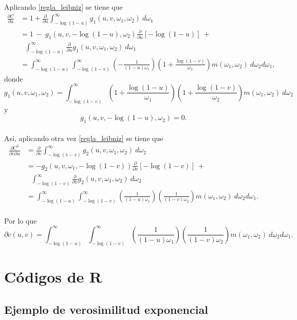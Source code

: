\documentclass[11pt,a4paper]{article}
\begin{document}
\begin{appendices}
Aplicando \eqref{regla_leibniz} se tiene que
\begin{align*}
\frac{\partial C}{\partial u} &= 1 + \frac{\partial}{\partial u} \int_{-\log (1-u)}^\infty g_1(u, v, \omega_1, \omega_2) \ d\omega_1\\
&= 1 \ - \ g_1(u, v, -\log (1-u), \omega_2)\frac{\partial}{\partial u}\left[ -\log (1-u) \right] \ +\\
& \ \ \ \int_{-\log (1-u)}^{\infty} \frac{\partial}{\partial u}g_1(u, v, \omega_1, \omega_2) \ d\omega_1\\
&= \int_{-\log (1-u)}^\infty \int_{-\log (1-v)}^\infty \left(-\frac{1}{(1-u)\omega_1}\right)\left(1+\frac{\log (1-v)}{\omega_2}\right) m(\omega_1, \omega_2) \ d\omega_2 d\omega_1,
\end{align*}
donde $$g_1(u, v, \omega_1, \omega_2) = \int_{-\log (1-v)}^\infty \left(1+\frac{\log (1-u)}{\omega_1}\right)\left(1+\frac{\log (1-v)}{\omega_2}\right) m(\omega_1, \omega_2) \ d\omega_2$$ y $$g_1(u, v, -\log (1-u), \omega_2) = 0.$$\\

Así, aplicando otra vez \eqref{regla_leibniz} se tiene que
\begin{align*}
\frac{\partial C^2}{\partial v \partial u} &= \frac{\partial}{\partial v} \int_{-\log (1-v)}^\infty g_2(u, v, \omega_1, \omega_2) \ d\omega_2\\
&= -g_2(u, v, \omega_1, -\log (1-v))\frac{\partial}{\partial v}\left[ -\log (1-v)\right] \ +\\
&\ \ \ \int_{-\log (1-v)}^\infty \frac{\partial}{\partial v}g_2(u, v, \omega_1, \omega_2) \ d\omega_2\\
&= \int_{-\log (1-u)}^\infty \int_{- \log (1-v)}^\infty \left(\frac{1}{(1-u)\omega_1}\right)\left(\frac{1}{(1-v)\omega_2}\right) m(\omega_1, \omega_2) \ d\omega_2 d\omega_1.\\
\end{align*}

Por lo que $$\partial c(u, v) = \int_{-\log (1-u)}^\infty \int_{- \log (1-v)}^\infty \left(\frac{1}{(1-u)\omega_1}\right)\left(\frac{1}{(1-v)\omega_2}\right) m(\omega_1, \omega_2) \ d\omega_2 d\omega_1.$$

\newpage

\section{Códigos de R}
\subsection{Ejemplo de verosimilitud exponencial}
\label{ap:lik}


\end{appendices}
\end{document}
